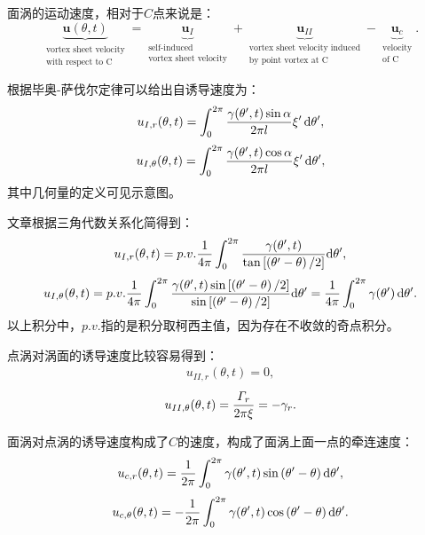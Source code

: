 \documentclass[UTF8,zihao=5]{ctexart} %
\begin{document}
面涡的运动速度，相对于$C$点来说是：
\begin{equation} \underbrace{\boldsymbol{u}(\theta,t)}_{\substack{\text{vortex sheet velocity} \\ \text{with respect to C}}}=\underbrace{\boldsymbol{u}_{I}}_{\substack{\text{self-induced} \\ \text{vortex sheet velocity}}}+\underbrace{\boldsymbol{u}_{II}}_{\substack{\text{vortex sheet velocity induced} \\ \text{by point vortex at C}}}-\underbrace{\boldsymbol{u}_{c}}_{\substack{\text{velocity} \\ \text{of C}}}. \end{equation}

根据毕奥-萨伐尔定律可以给出自诱导速度为：
\begin{gather} u_{I,r}(\theta,t)=\int_0^{2{\rm \pi}}\frac{\gamma(\theta',t)\sin{\alpha}}{2{\rm \pi} l}\xi'\,\textrm{d}\theta', \end{gather}
\begin{gather}u_{I,\theta}(\theta,t)=\int_0^{2{\rm \pi}}\frac{\gamma(\theta',t)\cos{\alpha}}{2{\rm \pi} l}\xi'\,\textrm{d}\theta', \end{gather}
其中几何量的定义可见示意图。

文章根据三角代数关系化简得到：
\begin{gather} u_{I,r} (\theta,t) = {p.v.}\frac{1}{4{\rm \pi}} \int_{0}^{2{\rm \pi}} \frac{\gamma(\theta',t)}{\tan{\left[\left(\theta'-\theta\right)/2\right]}}\textrm{d}\theta', \end{gather}
\begin{gather}u_{{I}, \theta} (\theta,t) = {p.v.}\frac{1}{4{\rm \pi}}\int_{0}^{2{\rm \pi}} \frac{\gamma(\theta',t)\sin{\left[\left(\theta'-\theta\right)/2\right]}}{\sin{\left[\left(\theta'-\theta\right)/2\right]}}\textrm{d}\theta'= \frac{1}{4{\rm \pi}}\int_{0}^{2{\rm \pi}}\gamma(\theta')\,\textrm{d}\theta'. \end{gather}
以上积分中，$p.v.$指的是积分取柯西主值，因为存在不收敛的奇点积分。

点涡对涡面的诱导速度比较容易得到：
\begin{gather} u_{{II},r} (\theta,t) = 0, \end{gather}
\begin{gather}u_{{II},\theta} (\theta,t) = \frac{\varGamma_r}{2{\rm \pi} \xi}={-}\gamma_r. \end{gather}

面涡对点涡的诱导速度构成了$C$的速度，构成了面涡上面一点的牵连速度：
\begin{gather} u_{c,r}(\theta,t)=\frac{1}{2{\rm \pi}}\int_0^{2{\rm \pi}}\gamma(\theta',t) \sin\left({\theta'-\theta}\right)\textrm{d}\theta', \end{gather}
\begin{gather}u_{c,\theta}(\theta,t)={-}\frac{1}{2{\rm \pi}}\int_0^{2{\rm \pi}}\gamma(\theta',t) \cos\left({\theta'-\theta}\right)\textrm{d}\theta'. \end{gather}
\end{document}
